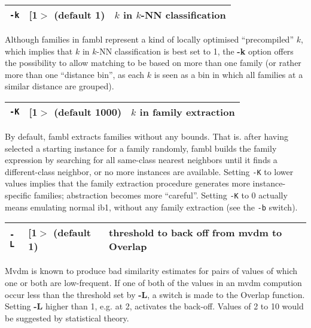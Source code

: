 \documentclass[11pt]{article}
\begin{document}
\begin{tabular}{|p{}|p{}|p{}|}
\hline
{\tt -k} & [1$>$ (default 1) & $k$ in $k$-NN classification \\
\hline
\end{tabular}

Although families in {\sc fambl} represent a kind of locally optimised
``precompiled'' $k$, which implies that $k$ in $k$-NN classification
is best set to 1, the {\bf -k} option offers the possibility to allow
matching to be based on more than one family (or rather more than one
``distance bin'', as each $k$ is seen as a bin in which all families
at a similar distance are grouped). 
\ \\

\begin{tabular}{|p{}|p{}|p{}|}
\hline
{\tt -K} & [1$>$ (default 1000) & $k$ in family extraction \\
\hline
\end{tabular}

By default, {\sc fambl} extracts families without any bounds. That
is. after having selected a starting instance for a family randomly,
{\sc fambl} builds the family expression by searching for all
same-class nearest neighbors until it finds a different-class
neighbor, or no more instances are available. Setting {\tt -K} to
lower values implies that the family extraction procedure generates
more instance-specific families; abstraction becomes more
``careful''. Setting {\tt -K} to 0 actually means emulating normal
{\sc ib1}, without any family extraction (see the {\tt -b} switch).
\ \\

\begin{tabular}{|p{}|p{}|p{}|}
\hline
{\tt -L} & [1$>$ (default 1) & threshold to back off from {\sc mvdm} to Overlap \\
\hline
\end{tabular}

{\sc Mvdm} is known to produce bad similarity estimates for pairs of
values of which one or both are low-frequent. If one of both of the
values in an {\sc mvdm} compution occur less than the threshold set by
{\bf -L}, a switch is made to the Overlap function. Setting {\bf -L}
higher than 1, e.g. at 2, activates the back-off. Values of 2 to 10
would be suggested by statistical theory. \ \\
\end{document}
